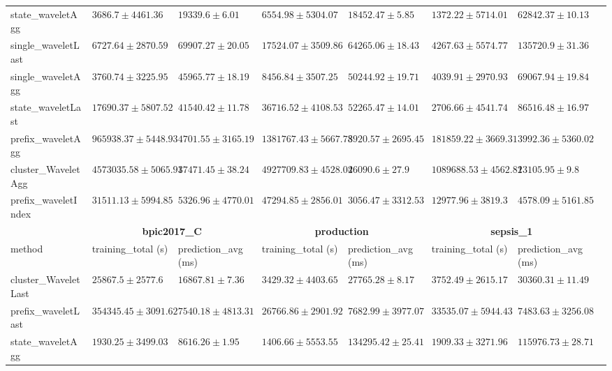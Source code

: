 \documentclass[twoside,11pt]{Latex/Classes/PhDthesisPSnPDF}
\begin{document}
\begin{table}[h]
{\begin{tabular}{llllllll}
		state\_waveletAgg & $\mathbf{3686.7 \pm 4461.36}$ & $19339.6 \pm 6.01$ & $\mathbf{6554.98 \pm 5304.07}$ & $18452.47 \pm 5.85$ & $\mathbf{1372.22 \pm 5714.01}$ & $62842.37 \pm 10.13$ \\ 
		single\_waveletLast & $6727.64 \pm 2870.59$ & $69907.27 \pm 20.05$ & $17524.07 \pm 3509.86$ & $64265.06 \pm 18.43$ & $4267.63 \pm 5574.77$ & $135720.9 \pm 31.36$ \\ 
		single\_waveletAgg & $3760.74 \pm 3225.95$ & $45965.77 \pm 18.19$ & $8456.84 \pm 3507.25$ & $50244.92 \pm 19.71$ & $4039.91 \pm 2970.93$ & $69067.94 \pm 19.84$ \\ 
		state\_waveletLast & $17690.37 \pm 5807.52$ & $41540.42 \pm 11.78$ & $36716.52 \pm 4108.53$ & $52265.47 \pm 14.01$ & $2706.66 \pm 4541.74$ & $86516.48 \pm 16.97$ \\ 
		prefix\_waveletAgg & $965938.37 \pm 5448.93$ & $\mathbf{4701.55 \pm 3165.19}$ & $1381767.43 \pm 5667.78$ & $3920.57 \pm 2695.45$ & $181859.22 \pm 3669.31$ & $\mathbf{3992.36 \pm 5360.02}$ \\ 
		cluster\_WaveletAgg & $4573035.58 \pm 5065.91$ & $37471.45 \pm 38.24$ & $4927709.83 \pm 4528.04$ & $26090.6 \pm 27.9$ & $1089688.53 \pm 4562.82$ & $13105.95 \pm 9.8$ \\ 
		prefix\_waveletIndex & $31511.13 \pm 5994.85$ & $5326.96 \pm 4770.01$ & $47294.85 \pm 2856.01$ & $\mathbf{3056.47 \pm 3312.53}$ & $12977.96 \pm 3819.3$ & $4578.09 \pm 5161.85$ \\ 
		\bottomrule
		\toprule
		& \multicolumn{2}{c}{{\bfseries bpic2017\_C}} & \multicolumn{2}{c}{{\bfseries production}} & \multicolumn{2}{c}{{\bfseries sepsis\_1}} \\ \cmidrule(lr){2-3} \cmidrule(lr){4-5} \cmidrule(lr){6-7}
		method  & training\_total (s) & prediction\_avg (ms) & training\_total (s) & prediction\_avg (ms) & training\_total (s) & prediction\_avg (ms) \\ \midrule
		cluster\_WaveletLast & $25867.5 \pm 2577.6$ & $16867.81 \pm 7.36$ & $3429.32 \pm 4403.65$ & $27765.28 \pm 8.17$ & $3752.49 \pm 2615.17$ & $30360.31 \pm 11.49$ \\ 
		prefix\_waveletLast & $354345.45 \pm 3091.62$ & $7540.18 \pm 4813.31$ & $26766.86 \pm 2901.92$ & $7682.99 \pm 3977.07$ & $33535.07 \pm 5944.43$ & $7483.63 \pm 3256.08$ \\ 
		state\_waveletAgg & $\mathbf{1930.25 \pm 3499.03}$ & $8616.26 \pm 1.95$ & $1406.66 \pm 5553.55$ & $134295.42 \pm 25.41$ & $1909.33 \pm 3271.96$ & $115976.73 \pm 28.71$ \\ 

\end{tabular}}
\end{table}
\end{document}
